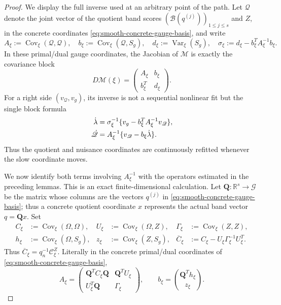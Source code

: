 \documentclass[11pt]{article}
\numberwithin{equation}{section}
\theoremstyle{definition}
\theoremstyle{remark}
\newcommand{\1}{\mathbf 1}
\begin{document}
\begin{proof}
We display the full inverse used at an arbitrary point of the path.
Let \(\mathscr Q\) denote the joint vector of the quotient band scores
\((\mathscr B(q^{(j)}))_{1\leq j\leq s}\) and \(Z\), in the concrete
coordinates \eqref{eq:smooth-concrete-gauge-basis}, and
write
\begin{equation}
 A_\xi:=\operatorname{Cov}_\xi(\mathscr Q,\mathscr Q),\quad
 b_\xi:=\operatorname{Cov}_\xi(\mathscr Q,S_g),\quad
 d_\xi:=\operatorname{Var}_\xi(S_g),\quad
 \sigma_\xi:=d_\xi-b_\xi^TA_\xi^{-1}b_\xi.
 \label{eq:smooth-full-covariance-blocks}
\end{equation}
In these primal/dual gauge coordinates, the Jacobian of \(\mathcal M\)
is exactly the covariance block
\begin{equation}
 D\mathcal M(\xi)=
 \begin{pmatrix}A_\xi&b_\xi\\ b_\xi^T&d_\xi\end{pmatrix}.
 \label{eq:smooth-full-moment-Jacobian}
\end{equation}
For a right side \((v_{\mathscr Q},v_g)\), its inverse is not a
sequential nonlinear fit but the single block formula
\begin{align}
 \dot\lambda&=\sigma_\xi^{-1}
       \{v_g-b_\xi^TA_\xi^{-1}v_{\mathscr Q}\},\notag\\
 \dot{\mathscr Q}&=A_\xi^{-1}
       \{v_{\mathscr Q}-b_\xi\dot\lambda\}.
 \label{eq:smooth-full-block-inverse}
\end{align}
Thus the quotient and nuisance coordinates are continuously refitted
whenever the slow coordinate moves.

We now identify both terms involving \(A_\xi^{-1}\) with the operators
estimated in the preceding lemmas.  This is an exact finite-dimensional
calculation.  Let \(\mathbf Q:\mathbb R^s\to\mathcal G\) be the matrix
whose columns are the vectors \(q^{(j)}\) in
\eqref{eq:smooth-concrete-gauge-basis}; thus a concrete quotient
coordinate \(x\) represents the actual band vector \(q=\mathbf Qx\).
Set
\begin{align*}
 C_\xi&:=\operatorname{Cov}_\xi(\Omega,\Omega),&
 U_\xi&:=\operatorname{Cov}_\xi(\Omega,Z),&
 \Gamma_\xi&:=\operatorname{Cov}_\xi(Z,Z),\\
 h_\xi&:=\operatorname{Cov}_\xi(\Omega,S_g),&
 z_\xi&:=\operatorname{Cov}_\xi(Z,S_g),&
 \overline C_\xi&:=C_\xi-U_\xi\Gamma_\xi^{-1}U_\xi^T.
\end{align*}
Thus \(\overline C_\xi=q_n^{-1}\mathcal C_\xi^Z\).  Literally in the
concrete primal/dual coordinates of
\eqref{eq:smooth-concrete-gauge-basis},
\begin{equation}
 A_\xi=
 \begin{pmatrix}
  \mathbf Q^TC_\xi\mathbf Q&\mathbf Q^TU_\xi\\
  U_\xi^T\mathbf Q&\Gamma_\xi
 \end{pmatrix},
 \qquad
 b_\xi=\binom{\mathbf Q^Th_\xi}{z_\xi}.
 \label{eq:smooth-concrete-full-blocks}
\end{equation}


\end{proof}
\end{document}
